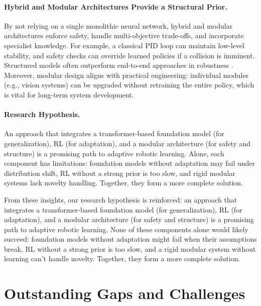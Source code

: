 \paragraph{Hybrid and Modular Architectures Provide a Structural Prior.}
By not relying on a single monolithic neural network, hybrid and modular architectures enforce safety, handle multi-objective trade-offs, and incorporate specialist knowledge. For example, a classical \ac{PID} loop can maintain low-level stability, and safety checks can override learned policies if a collision is imminent. Structured models often outperform end-to-end approaches in robustness \cite{CHRL2019}. Moreover, modular design aligns with practical engineering: individual modules (e.g., vision systems) can be upgraded without retraining the entire policy, which is vital for long-term system development.

\paragraph{Research Hypothesis.}
An approach that integrates a transformer-based foundation model (for generalization), \ac{RL} (for adaptation), and a modular architecture (for safety and structure) is a promising path to adaptive robotic learning. Alone, each component has limitations: foundation models without adaptation may fail under distribution shift, \ac{RL} without a strong prior is too slow, and rigid modular systems lack novelty handling. Together, they form a more complete solution.

From these insights, our research hypothesis is reinforced: an approach that integrates a transformer-based foundation model (for generalization), \ac{RL} (for adaptation), and a modular architecture (for safety and structure) is a promising path to adaptive robotic learning. None of these components alone would likely succeed: foundation models without adaptation might fail when their assumptions break, \ac{RL} without a strong prior is too slow, and a rigid modular system without learning can't handle novelty. Together, they form a more complete solution.

\section{Outstanding Gaps and Challenges}

